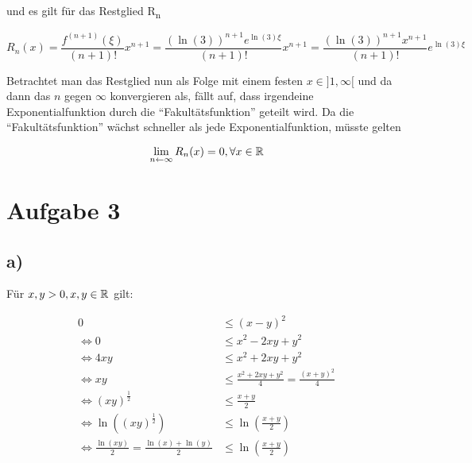 \documentclass[a4paper, 11pt]{article}
\begin{document}
und es gilt für das Restglied R\textsubscript{n}

\begin{equation*}
    R_n(x) = \frac{f^{(n+1)}(\xi)}{(n+1)!}x^{n+1}
        = \frac{ (\ln(3))^{n+1} e^{\ln(3)\xi}}{(n+1)!}x^{n+1}
        = \frac{ (\ln(3))^{n+1} x^{n+1}}{(n+1)!} e^{\ln(3)\xi}
\end{equation*}

Betrachtet man das Restglied nun als Folge mit einem festen \(x \in ]1, \infty[\)
und da dann das \(n\) gegen \(\infty\) konvergieren als, fällt auf, dass irgendeine
Exponentialfunktion durch die "`Fakultätsfunktion"' geteilt wird. Da die "`Fakultätsfunktion"' wächst
schneller als jede Exponentialfunktion, müsste gelten

\begin{equation*}
    \lim_{n \leftarrow \infty} R_n(x) = 0, \forall x \in \mathbb{R}
\end{equation*}

\section{Aufgabe 3}
\label{sec:orgcc10a38}
\subsection{a)}
\label{sec:org86063fe}
Für \(x,y > 0, x,y \in \mathbb{R}\) gilt:

\begin{align*}
    0 &\leq (x-y)^2 \\
    \Leftrightarrow 0 &\leq x^2 -2xy+y^2 \\
    \Leftrightarrow 4xy &\leq x^2 + 2xy + y^2 \\
    \Leftrightarrow xy &\leq \frac{x^2+2xy+y^2}{4} = \frac{(x+y)^2}{4} \\
    \Leftrightarrow (xy)^{\frac{1}{2}} &\leq \frac{x+y}{2} \\
    \Leftrightarrow \ln((xy)^{\frac{1}{2}}) &\leq \ln\left(\frac{x+y}{2}\right) \\
    \Leftrightarrow \frac{\ln(xy)}{2} = \frac{\ln(x) + \ln(y)}{2} &\leq \ln\left(\frac{x+y}{2}\right)
\end{align*}
\end{document}
